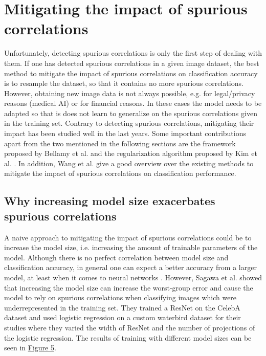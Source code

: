\documentclass{article}
\begin{document}
\section{Mitigating the impact of spurious correlations}
Unfortunately, detecting spurious correlations is only the first step of dealing with them. If one has detected spurious correlations in a given image dataset, the best method to mitigate the impact of spurious correlations on classification accuracy is to resample the dataset, so that it contains no more spurious correlations. However, obtaining new image data is not always possible, e.g. for legal/privacy reasons (medical AI) or for financial reasons. In these cases the model needs to be adapted so that is does not learn to generalize on the spurious correlations given in the training set. Contrary to detecting spurious correlations, mitigating their impact has been studied well in the last years. Some important contributions apart from the two mentioned in the following sections are the framework proposed by Bellamy et al. \cite{bellamy2018ai} and the regularization algorithm proposed by Kim et al. \cite{Kim_2019_CVPR}. In addition, Wang et al. \cite{Wang_2020_CVPR} give a good overview over the existing methods to mitigate the impact of spurious correlations on classification performance.

\subsection{Why increasing model size exacerbates spurious correlations}
A naive approach to mitigating the impact of spurious correlations could be to increase the model size, i.e. increasing the amount of trainable parameters of the model. Although there is no perfect correlation between model size and classification accuracy, in general one can expect a better accuracy from a larger model, at least when it comes to neural networks \cite{8395231}. However, Sagawa et al. \cite{pmlr-v119-sagawa20a} showed that increasing the model size can increase the worst-group error and cause the model to rely on spurious correlations when classifying images which were underrepresented in the training set. They trained a ResNet \cite{He_2016_CVPR} on the CelebA dataset \cite{liu2015faceattributes} and used logistic regression on a custom waterbird dataset for their studies where they varied the width of ResNet and the number of projections of the logistic regression. The results of training with different model sizes can be seen in \hyperref[fig:sagawaImg]{Figure 5}.
\end{document}
